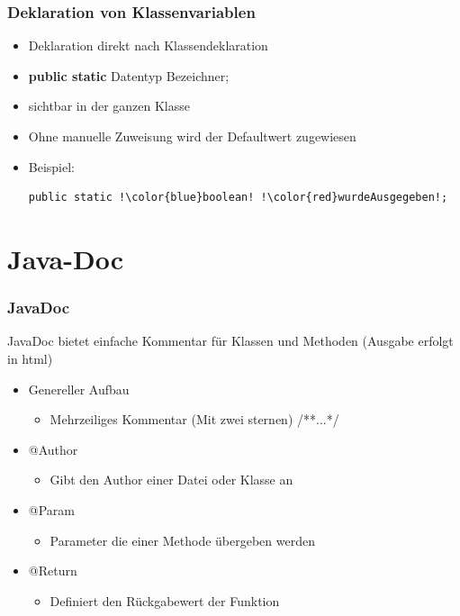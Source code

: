 \documentclass[final]{beamer}
\begin{document}
\begin{frame}[containsverbatim]
	\frametitle{Deklaration von Klassenvariablen}
	\begin{itemize}
		\item{Deklaration direkt nach Klassendeklaration}
		\item{\textbf{public static} {\color{blue}Datentyp} {\color{red}Bezeichner};}
		\item{sichtbar in der ganzen Klasse}
		\item{Ohne manuelle Zuweisung wird der Defaultwert zugewiesen}
		\item{Beispiel:
			\begin{lstlisting}[escapechar=!]
public static !\color{blue}boolean! !\color{red}wurdeAusgegeben!;
			\end{lstlisting}
		}
	\end{itemize}
\end{frame}

\section{Java-Doc}
\begin{frame}
	\frametitle{JavaDoc}
	JavaDoc bietet einfache Kommentar für Klassen und Methoden (Ausgabe erfolgt in html)
	\begin{itemize}
		\item{Genereller Aufbau}
			\begin{itemize}
				\item{Mehrzeiliges Kommentar (Mit zwei sternen) /**...*/}
			\end{itemize}
		\item{@Author}
			\begin{itemize}
				\item{Gibt den Author einer Datei oder Klasse an}
			\end{itemize}
		\item{@Param}
			\begin{itemize}
				\item{Parameter die einer Methode übergeben werden}
			\end{itemize}
		\item{@Return}
			\begin{itemize}
				\item{Definiert den Rückgabewert der Funktion}
			\end{itemize}
	\end{itemize}
\end{frame}
\end{document}
